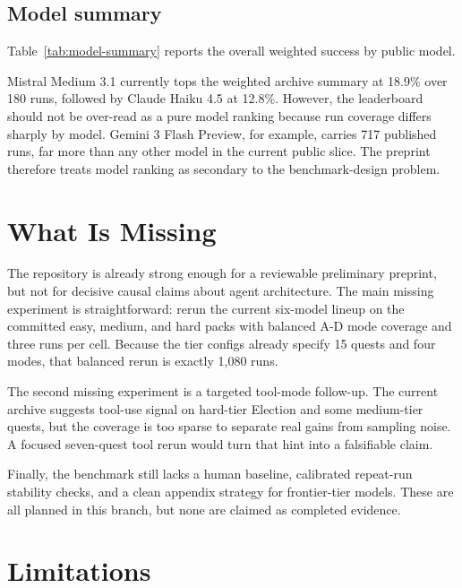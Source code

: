 \documentclass[11pt]{article}
\begin{document}
\subsection{Model summary}

Table~\ref{tab:model-summary} reports the overall weighted success by public model.

\begin{table}[t]
  \centering
  \caption{Weighted success across the full public archive by model.}
  \label{tab:model-summary}
  
\end{table}

Mistral Medium 3.1 currently tops the weighted archive summary at 18.9\% over 180 runs, followed by Claude Haiku 4.5 at 12.8\%. However, the leaderboard should not be over-read as a pure model ranking because run coverage differs sharply by model. Gemini 3 Flash Preview, for example, carries 717 published runs, far more than any other model in the current public slice. The preprint therefore treats model ranking as secondary to the benchmark-design problem.

\section{What Is Missing}

The repository is already strong enough for a reviewable preliminary preprint, but not for decisive causal claims about agent architecture. The main missing experiment is straightforward: rerun the current six-model lineup on the committed easy, medium, and hard packs with balanced A-D mode coverage and three runs per cell. Because the tier configs already specify 15 quests and four modes, that balanced rerun is exactly 1{,}080 runs.

The second missing experiment is a targeted tool-mode follow-up. The current archive suggests tool-use signal on hard-tier Election and some medium-tier quests, but the coverage is too sparse to separate real gains from sampling noise. A focused seven-quest tool rerun would turn that hint into a falsifiable claim.

Finally, the benchmark still lacks a human baseline, calibrated repeat-run stability checks, and a clean appendix strategy for frontier-tier models. These are all planned in this branch, but none are claimed as completed evidence.

\section{Limitations}
\end{document}
